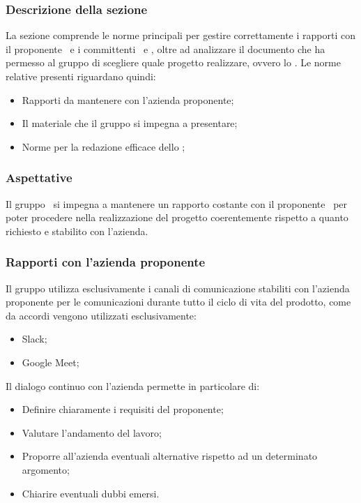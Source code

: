 \subsubsection{Descrizione della sezione} 
La sezione comprende le norme principali per gestire correttamente i rapporti con il proponente \Proponente\ e i committenti \VT\ e \CR, oltre ad analizzare il documento che ha permesso al gruppo di scegliere quale progetto realizzare, ovvero lo \SdFv.
Le norme relative presenti riguardano quindi:
\begin{itemize}
	\item Rapporti da mantenere con l'azienda proponente;
	\item Il materiale che il gruppo si impegna a presentare;
	\item Norme per la redazione efficace dello \SdFv;
\end{itemize}

\subsubsection{Aspettative}
Il gruppo \Gruppo\ si impegna a mantenere un rapporto costante con il proponente \Proponente\ per poter procedere nella realizzazione del progetto coerentemente rispetto a quanto richiesto e stabilito con l'azienda. 

\subsubsection{Rapporti con l'azienda proponente \Proponente }\label{Rapporti RedBabel}
Il gruppo utilizza esclusivamente i canali di comunicazione stabiliti con l'azienda proponente per le comunicazioni durante tutto il ciclo di vita del prodotto, come da accordi vengono utilizzati esclusivamente:
\begin{itemize}
	\item Slack;
	\item Google Meet;
\end{itemize}
Il dialogo continuo con l'azienda permette in particolare di:
\begin{itemize}
	\item Definire chiaramente i requisiti del proponente;
	\item Valutare l'andamento del lavoro;
	\item Proporre all'azienda eventuali alternative rispetto ad un determinato argomento;
	\item Chiarire eventuali dubbi emersi.
\end{itemize}

